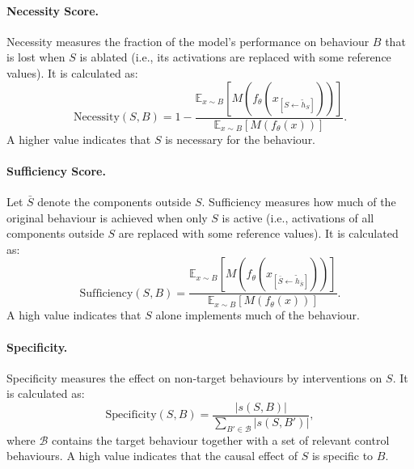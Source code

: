 \begin{definitionbox}

\paragraph{Necessity Score.}
Necessity measures the fraction of the model’s performance on behaviour \(B\) that is lost when \(S\) is ablated (i.e., its activations are replaced with some reference values). It is calculated as:
\[
\mathrm{Necessity}(S,B)
=
1-
\frac{
\mathbb{E}_{x\sim B}
\left[
M\!\left(
f_\theta\!\left(
x_{[S\leftarrow\tilde h_S]}
\right)
\right)
\right]
}{
\mathbb{E}_{x\sim B}
\left[
M\!\left(f_\theta(x)\right)
\right]
}.
\]
A higher value indicates that \(S\) is necessary for the behaviour.\\

\paragraph{Sufficiency Score.}
Let \(\bar S\) denote the components outside \(S\). Sufficiency measures how much of the original behaviour is achieved when only \(S\) is active (i.e., activations of all components outside \(S\) are replaced with some reference values). It is calculated as:
\[
\mathrm{Sufficiency}(S,B)
=
\frac{
\mathbb{E}_{x\sim B}
\left[
M\!\left(
f_\theta\!\left(
x_{[\bar S \leftarrow \tilde h_{\bar S}]}
\right)
\right)
\right]
}{
\mathbb{E}_{x\sim B}
\left[
M\!\left(f_\theta(x)\right)
\right]
}.
\]
A high value indicates that \(S\) alone implements much of the behaviour.\\

\paragraph{Specificity.}
Specificity measures the effect on non-target behaviours by interventions on \(S\). It is calculated as:
\[
\mathrm{Specificity}(S,B)
=
\frac{
|s(S,B)|
}{
\sum_{B' \in \mathcal{B}}
|s(S,B')|
},
\]
where \(\mathcal{B}\) contains the target behaviour together with a set of relevant control behaviours. A high value indicates that the causal effect of \(S\) is specific to \(B\).

\end{definitionbox}


